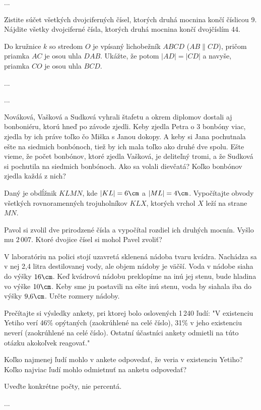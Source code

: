 {%
...}

{%
\begin{itemize}
 Zistite súčet všetkých dvojciferných čísel, ktorých druhá mocnina končí číslicou 9.
 Nájdite všetky dvojciferné čísla, ktorých druhá mocnina končí dvojčíslím 44.
\end{itemize}
}

{%
Do kružnice $k$ so stredom $O$ je vpísaný lichobežník $ABCD$ ($AB\parallel CD$), pričom priamka $AC$ je
osou uhla $DAB$. Ukážte, že potom $|AD|=|CD|$ a navyše, priamka $CO$ je osou uhla $BCD$.}

{%
...}

{%
...}

{%
Nováková, Vašková a Sudková vyhrali štafetu a okrem diplomov dostali aj bonboniéru, ktorú hneď po
závode zjedli. Keby zjedla Petra o 3 bonbóny viac, zjedla by ich práve toľko čo Miška s Janou dokopy.
A keby si Jana pochutnala ešte na siedmich bonbónoch, tiež by ich mala toľko ako druhé dve spolu. Ešte
vieme, že počet bonbónov, ktoré zjedla Vašková, je deliteľný tromi, a že Sudková si pochutila na
siedmich bonbónoch. Ako sa volali dievčatá? Koľko bonbónov zjedla každá z nich?}

{%
Daný je obdĺžnik $KLMN$, kde $|KL| = 6\cm$ a $|ML| = 4\cm$. Vypočítajte obvody všetkých rovnoramenných
trojuholníkov $KLX$, ktorých vrchol $X$ leží na strane $MN$.}

{%
Pavol si zvolil dve prirodzené čísla a vypočítal rozdiel ich druhých mocnín. Vyšlo mu
$2\,007$.
Ktoré dvojice čísel si mohol Pavel zvoliť?}

{%
V laboratóriu na polici stojí uzavretá sklenená nádoba tvaru kvádra. Nachádza sa v nej
2,4 litra destilovanej vody, ale objem nádoby je väčší. Voda v nádobe siaha do výšky
$16\cm$. Keď kvádrovú nádobu preklopíme na inú jej stenu, bude hladina vo výške
$10\cm$. Keby sme ju postavili na ešte inú stenu, voda by siahala iba do výšky $9{,}6\cm$.
Určte rozmery nádoby.}

{%
Prečítajte si výsledky ankety, pri ktorej bolo oslovených 1\,240 ľudí:
"V existenciu Yetiho verí 46\% opýtaných (zaokrúhlené na
celé číslo), 31\% v jeho existenciu neverí (zaokrúhlené na celé
číslo). Ostatní účastníci ankety odmietli na túto otázku
akokoľvek reagovať."
\begin{itemize}
 Koľko najmenej ľudí mohlo v ankete odpovedať, že veria v existenciu Yetiho?
 Koľko najviac ľudí mohlo odmietnuť na anketu odpovedať?
\end{itemize}
\noindent
Uveďte konkrétne počty, nie percentá.}

{%
...}


